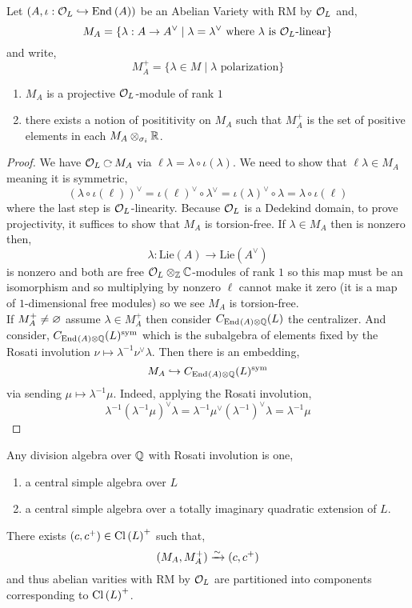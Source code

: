 \documentclass[12pt]{article}
\begin{document}
\begin{defn}
Let $(A, \iota : \mathcal{O}_L \hookrightarrow \mathrm{End}_{} \left( A \right))$ be an Abelian Variety with RM by $\mathcal{O}_L$ and,
\[ M_A = \{ \lambda : A \to A^\vee \mid \lambda = \lambda^\vee \text{ where } \lambda \text{ is } \mathcal{O}_L\text{-linear} \} \]
and write,
\[ M^+_A = \{ \lambda \in M \mid \lambda \text{ polarization} \} \]
\end{defn}

\begin{lemma}
\begin{enumerate}
\item $M_A$ is a projective $\mathcal{O}_L$-module of rank $1$
\item there exists a notion of posititivity on $M_A$ such that $M_A^+$ is the set of positive elements in each $M_A \otimes_{\sigma_i} \mathbb{R}$. 
\end{enumerate}
\end{lemma}

\newcommand{\Lie}{\mathrm{Lie}}

\begin{proof}
We have $\cO_L \acts M_A$ via $\ell \lambda = \lambda \circ \iota(\lambda)$. We need to show that $\ell \lambda \in M_A$ meaning it is symmetric,
\[ (\lambda \circ \iota(\ell))^\vee = \iota(\ell)^\vee \circ \lambda^\vee = \iota(\lambda)^\vee \circ \lambda = \lambda \circ \iota(\ell) \]
where the last step is $\mathcal{O}_L$-linearity. Because $\mathcal{O}_L$ is a Dedekind domain, to prove projectivity, it suffices to show that $M_A$ is torsion-free. If $\lambda \in M_A$ then is nonzero then,
\[ \lambda : \Lie(A) \to \Lie(A^\vee) \]
is nonzero and both are free $\mathcal{O}_L \otimes_{\mathbb{Z}} \mathbb{C}$-modules of rank $1$ so this map must be an isomorphism and so multiplying by nonzero $\ell$ cannot make it zero (it is a map of $1$-dimensional free modules) so we see $M_A$ is torsion-free.
\bigskip\\
If $M^+_A \neq \varnothing$ assume $\lambda \in M_A^+$ then consider $C_{\mathrm{End}_{} \left( A \right) \otimes \mathbb{Q}}(L)$ the centralizer. And consider, $C_{\mathrm{End}_{} \left( A \right) \otimes \mathbb{Q}}(L)^{\text{sym}}$ which is the subalgebra of elements fixed by the Rosati involution $\nu \mapsto \lambda^{-1} \nu^\vee \lambda$. Then there is an embedding,
\[ M_A \hookrightarrow C_{\mathrm{End}_{} \left( A \right) \otimes \mathbb{Q}}(L)^{\text{sym}} \]
via sending $\mu \mapsto \lambda^{-1} \mu$. Indeed, applying the Rosati involution,
\[ \lambda^{-1} (\lambda^{-1} \mu)^\vee \lambda = \lambda^{-1} \mu^\vee (\lambda^{-1})^\vee \lambda = \lambda^{-1} \mu \]
\end{proof}


\begin{rmk}
Any division algebra over $\mathbb{Q}$ with Rosati involution is one,
\begin{enumerate}
\item a central simple algebra over $L$
\item a central simple algebra over a totally imaginary quadratic extension of $L$.
\end{enumerate}
There exists $(c, c^+) \in \mathrm{Cl} \left( L \right)^+$ such that,
\[ (M_A, M_A^+) \xrightarrow{\sim} (c, c^+) \]
and thus abelian varities with RM by $\mathcal{O}_L$ are partitioned into components corresponding to $\mathrm{Cl} \left( L \right)^+$. 
\end{rmk}
\end{document}
